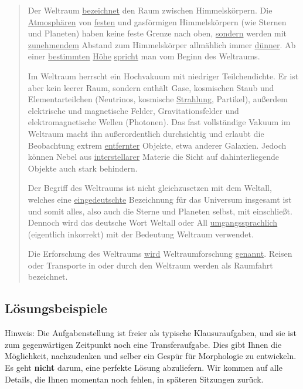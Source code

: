 \documentclass[12pt,a4paper,twoside]{article}
\newcommand{\grau}[1]{\textcolor{grau}{#1}}
\begin{document}
\begin{quote}

  Der Weltraum \grau{\ul{bezeichnet}} den Raum zwischen Himmelskörpern. Die \grau{\ul{Atmosphären}} von \ul{festen} und gasförmigen Himmelskörpern (wie Sternen und Planeten) haben keine feste Grenze nach oben, \ul{sondern} werden mit \ul{zunehmendem} Abstand zum Himmelskörper allmählich immer \ul{dünner}. Ab einer \ul{bestimmten} \ul{Höhe} \ul{spricht} man vom Beginn des Weltraums.

  Im Weltraum herrscht ein Hochvakuum mit niedriger Teilchendichte. Er ist aber kein leerer Raum, sondern enthält Gase, kosmischen Staub und Elementarteilchen (Neutrinos, kosmische \ul{Strahlung}, Partikel), außerdem elektrische und magnetische Felder, Gravitationsfelder und elektromagnetische Wellen (Photonen). Das fast vollständige Vakuum im Weltraum macht ihn außerordentlich durchsichtig und erlaubt die Beobachtung extrem \ul{entfernter} Objekte, etwa anderer Galaxien. Jedoch können Nebel aus \ul{interstellarer} Materie die Sicht auf dahinterliegende Objekte auch stark behindern.

  Der Begriff des Weltraums ist nicht gleichzusetzen mit dem Weltall, welches eine \ul{eingedeutschte} Bezeichnung für das Universum insgesamt ist und somit alles, also auch die Sterne und Planeten selbst, mit einschließt. Dennoch wird das deutsche Wort Weltall oder All \ul{umgangssprachlich} (eigentlich inkorrekt) mit der Bedeutung Weltraum verwendet.

  Die Erforschung des Weltraums \ul{wird} Weltraumforschung \ul{genannt}. Reisen oder Transporte in oder durch den Weltraum werden als Raumfahrt bezeichnet.
\end{quote}

\newpage

\subsection{Lösungsbeispiele}

Hinweis: Die Aufgabenstellung ist freier als typische Klausuraufgaben, und sie ist zum gegenwärtigen Zeitpunkt noch eine Transferaufgabe.
Dies gibt Ihnen die Möglichkeit, nachzudenken und selber ein Gespür für Morphologie zu entwickeln.
Es geht \textbf{nicht} darum, eine perfekte Lösung abzuliefern.
Wir kommen auf alle Details, die Ihnen momentan noch fehlen, in späteren Sitzungen zurück.
\end{document}
